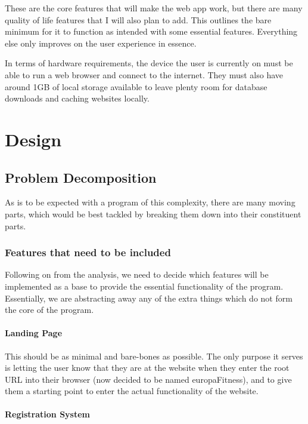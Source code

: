 \documentclass{article}
\begin{document}
These are the core features that will make the web app work, but there are many quality of life features that I will also plan to add. This outlines the bare minimum for it to function as intended with some essential features. Everything else only improves on the user experience in essence. 

In terms of hardware requirements, the device the user is currently on must be able to run a web browser and connect to the internet. They must also have around 1GB of local storage available to leave plenty room for database downloads and caching websites locally.

\section{Design}

\subsection{Problem Decomposition}

As is to be expected with a program of this complexity, there are many moving parts, which would be best tackled by breaking them down into their constituent parts. 

\subsubsection{Features that need to be included}

Following on from the analysis, we need to decide which features will be implemented as a base to provide the essential functionality of the program. Essentially, we are abstracting away any of the extra things which do not form the core of the program. 

\paragraph{Landing Page}

This should be as minimal and bare-bones as possible. The only purpose it serves is letting the user know that they are at the website when they enter the root URL into their browser (now decided to be named europaFitness), and to give them a starting point to enter the actual functionality of the website. 

\paragraph{Registration System} 
\end{document}
